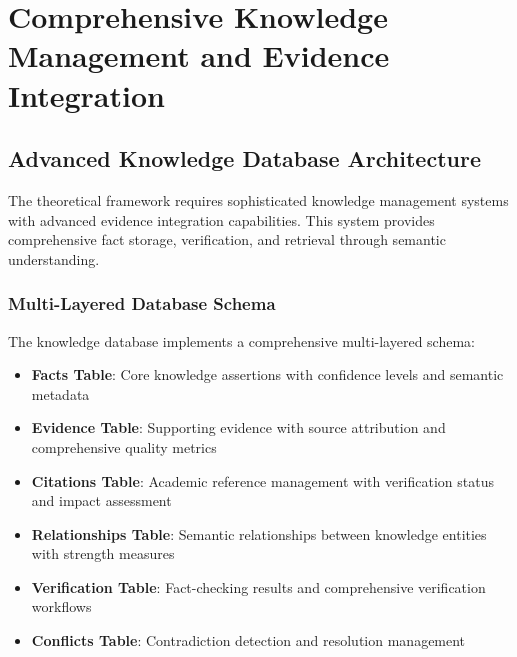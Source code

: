 \documentclass[12pt,a4paper,twoside]{article}
\begin{document}
\section{Comprehensive Knowledge Management and Evidence Integration}

\subsection{Advanced Knowledge Database Architecture}

The theoretical framework requires sophisticated knowledge management systems with advanced evidence integration capabilities. This system provides comprehensive fact storage, verification, and retrieval through semantic understanding.

\subsubsection{Multi-Layered Database Schema}

The knowledge database implements a comprehensive multi-layered schema:

\begin{itemize}
\item \textbf{Facts Table}: Core knowledge assertions with confidence levels and semantic metadata
\item \textbf{Evidence Table}: Supporting evidence with source attribution and comprehensive quality metrics
\item \textbf{Citations Table}: Academic reference management with verification status and impact assessment
\item \textbf{Relationships Table}: Semantic relationships between knowledge entities with strength measures
\item \textbf{Verification Table}: Fact-checking results and comprehensive verification workflows
\item \textbf{Conflicts Table}: Contradiction detection and resolution management
\end{itemize}
\end{document}
